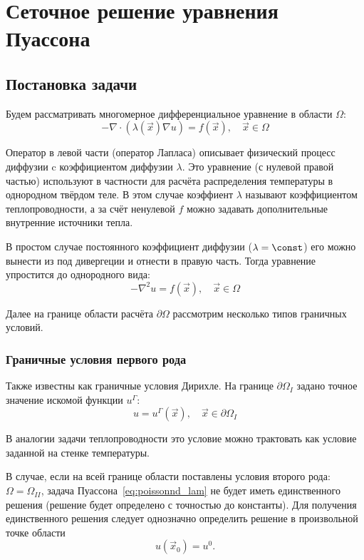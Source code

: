 \section{Сеточное решение уравнения Пуассона}
\subsection{Постановка задачи}

Будем рассматривать многомерное дифференциальное уравнение в области $\Omega$:
\begin{equation}
    \label{eq:poissonnd_lam}
    -\nabla\cdot\left(\lambda(\vec x)\nabla u\right) = f(\vec x), \quad \vec x \in \Omega
\end{equation}

Оператор в левой части (оператор Лапласа)
описывает физический процесс диффузии c коэффициентом диффузии $\lambda$.
Это уравнение (с нулевой правой частью) используют
в частности для расчёта распределения температуры в однородном твёрдом теле.
В этом случае коэффиент $\lambda$ называют коэффициентом теплопроводности,
а за счёт ненулевой $f$ можно задавать дополнительные
внутренние источники тепла.

В простом случае постоянного коэффициент диффузии ($\lambda = \const$) его
можно вынести из под дивергеции и отнести в правую часть. Тогда уравнение упростится до однородного вида:
\begin{equation}
    \label{eq:poissonnd}
    -\nabla^2 u = f(\vec x), \quad \vec x \in \Omega
\end{equation}

Далее на границе области расчёта $\partial \Omega$
рассмотрим несколько типов граничных условий.

\subsubsection{Граничные условия первого рода}
Также известны как граничные условия Дирихле.
На границе $\partial \Omega_{I}$ задано точное значение искомой функции $u^\Gamma$:
\begin{equation}
\label{eq:poissonnd_bc}
u = u^\Gamma(\vec x), \quad \vec x \in \partial\Omega_I
\end{equation}

В аналогии задачи теплопроводности это условие
можно трактовать как условие заданной на стенке температуры.

В случае, если на всей границе области поставлены условия второго рода: $\Omega = \Omega_{II}$,
задача Пуассона~\cref{eq:poissonnd_lam} не будет иметь единственного решения (решение будет определено
с точностью до константы). Для получения единственного решения следует
однозначно определить решение в произвольной точке области
$$
u(\vec x_0) = u^0.
$$

